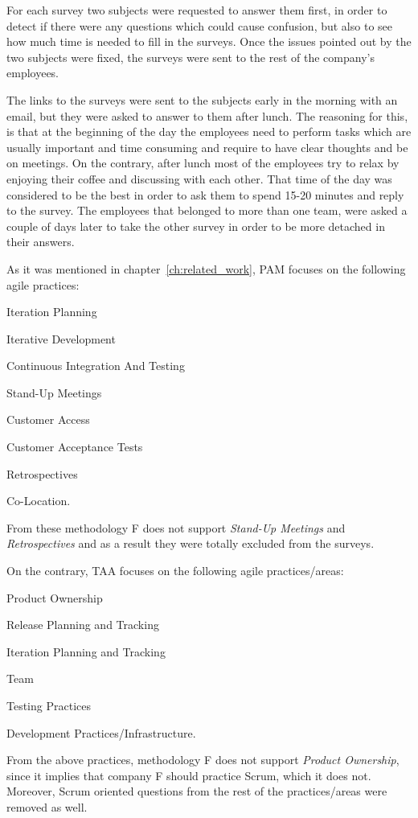 For each survey two subjects were requested to answer them first, in order to detect if there were any questions which could cause confusion, but also to see how much time is needed to fill in the surveys. Once the issues pointed out by the two subjects were fixed, the surveys were sent to the rest of the company's employees.

The links to the surveys were sent to the subjects early in the morning with an email, but they were asked to answer to them after lunch. The reasoning for this, is that at the beginning of the day the employees need to perform tasks which are usually important and time consuming and require to have clear thoughts and be on meetings. On the contrary, after lunch most of the employees try to relax by enjoying their coffee and discussing with each other. That time of the day was considered to be the best in order to ask them to spend 15-20 minutes and reply to the survey. The employees that belonged to more than one team, were asked a couple of days later to take the other survey in order to be more detached in their answers.

As it was mentioned in chapter~\ref{ch:related_work}, PAM focuses on the following agile practices:
\begin{inparaenum} [a\upshape)]
	\item Iteration Planning
	\item Iterative Development
	\item Continuous Integration And Testing
	\item Stand-Up Meetings
	\item Customer Access
	\item Customer Acceptance Tests
	\item Retrospectives
	\item Co-Location.
\end{inparaenum}
From these methodology F does not support \textit{Stand-Up Meetings} and \textit{Retrospectives} and as a result they were totally excluded from the surveys.

On the contrary, TAA focuses on the following agile practices/areas:
\begin{inparaenum} [a\upshape)]
	\item Product Ownership
	\item Release Planning and Tracking
	\item Iteration Planning and Tracking
	\item Team
	\item Testing Practices
	\item Development Practices/Infrastructure.
\end{inparaenum}
From the above practices, methodology F does not support \textit{Product Ownership}, since it implies that company F should practice Scrum, which it does not. Moreover, Scrum oriented questions from the rest of the practices/areas were removed as well. 

